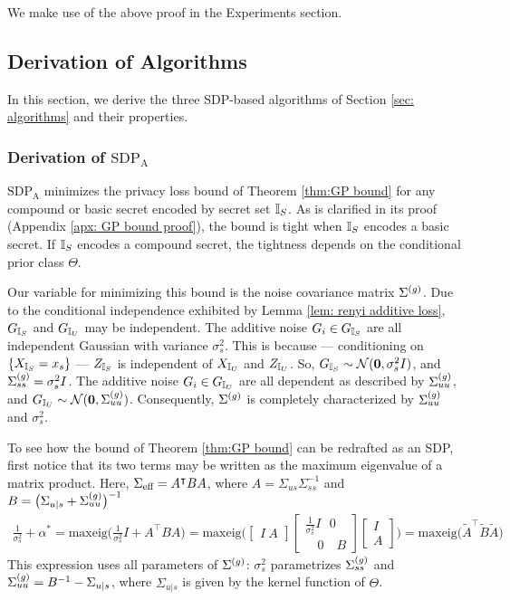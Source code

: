 We make use of the above proof in the Experiments section. 

\subsection{Derivation of Algorithms}
\label{apx: algorithmns}
In this section, we derive the three SDP-based algorithms of Section \ref{sec: algorithms} and their properties. 

\subsubsection{Derivation of $\text{SDP}_\text{A}$}

$\text{SDP}_\text{A}$ minimizes the privacy loss bound of Theorem \ref{thm:GP bound} for any compound or basic secret encoded by secret set ${\mathbb{I}_S}$. As is clarified in its proof (Appendix \ref{apx: GP bound proof}), the bound is tight when ${\mathbb{I}_S}$ encodes a basic secret. If ${\mathbb{I}_S}$ encodes a compound secret, the tightness depends on the conditional prior class $\Theta$. 

Our variable for minimizing this bound is the noise covariance matrix $\Sigma^{(g)}$. Due to the conditional independence exhibited by Lemma \ref{lem: renyi additive loss}, ${G_{\mathbb{I}_S}}$ and ${G_{\mathbb{I}_U}}$ may be independent. The additive noise $G_i \in {G_{\mathbb{I}_S}}$ are all independent Gaussian with variance $\sigma_s^2$. This is because --- conditioning on $\{{X_{\mathbb{I}_S}} = x_s\}$ --- ${Z_{\mathbb{I}_S}}$ is independent of ${X_{\mathbb{I}_U}}$ and ${Z_{\mathbb{I}_U}}$. So, ${G_{\mathbb{I}_S}} \sim \mathcal{N}(\mathbf{0}, \sigma_s^2 I)$, and $\Sigma^{(g)}_{ss} = \sigma_s^2 I$. The additive noise $G_i \in {G_{\mathbb{I}_U}}$ are all dependent as described by $\Sigma^{(g)}_{uu}$, and ${G_{\mathbb{I}_U}} \sim \mathcal{N}(\mathbf{0}, \Sigma^{(g)}_{uu})$. Consequently, $\Sigma^{(g)}$ is completely characterized by $\Sigma^{(g)}_{uu}$ and $\sigma_s^2$. 

To see how the bound of Theorem \ref{thm:GP bound} can be redrafted as an SDP, first notice that its two terms may be written as the maximum eigenvalue of a matrix product. Here, $\Sigma_{\text{eff}} = A^\intercal B A$, where $A = \Sigma_{us} \Sigma_{ss}^{-1}$ and $B = \big( \Sigma_{u | s} + \Sigma^{(g)}_{uu} \big)^{-1}$
\begin{align*}
	\frac{1}{\sigma_s^2} + \alpha^*
	= \text{maxeig} \big( 
	\frac{1}{\sigma_s^2} I + A^\intercal B A \big)
	= \text{maxeig} \bigg(  
	\begin{bmatrix}
		I \  A
	\end{bmatrix} 
	\begin{bmatrix}
		\frac{1}{\sigma_s^2} I \ \ \  0 \\
		\quad 0 \quad  B
	\end{bmatrix}
	\begin{bmatrix}
		I \\ A
	\end{bmatrix}
	\bigg) 
	= \text{maxeig} \big( \tilde{A}^\intercal \tilde{B} \tilde{A} \big) 
\end{align*}
This expression uses all parameters of $\Sigma^{(g)}$: $\sigma_s^2$ parametrizes $\Sigma^{(g)}_{ss}$ and $\Sigma^{(g)}_{uu} = B^{-1} - \Sigma_{u|s}$, where $\Sigma_{u|s}$ is given by the kernel function of $\Theta$. 

